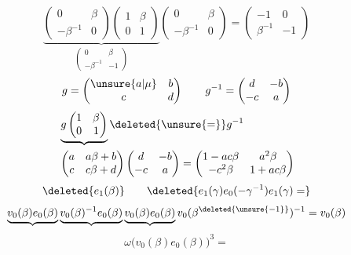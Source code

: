 \[\underbrace{\begin{pmatrix}0&\beta\\-\beta^{-1}&0\end{pmatrix}\begin{pmatrix}1&\beta\\0&1\end{pmatrix}}_{\begin{pmatrix}0&\beta\\-\beta^{-1}&-1\end{pmatrix}}\begin{pmatrix}0&\beta\\-\beta^{-1}&0\end{pmatrix}=\begin{pmatrix}-1&0\\\beta^{-1}&-1\end{pmatrix}\]
\[g=\begin{pmatrix}\unsure{a|\mu}&b\\c&d\end{pmatrix}\qquad g^{-1}=\begin{pmatrix}d&-b\\-c&a\end{pmatrix}\]
\[\begin{aligned}
&\underbrace{g\begin{pmatrix}1&\beta\\0&1\end{pmatrix}}\deleted{\unsure{=}}g^{-1}\\
&\begin{pmatrix}a&a\beta+b\\c&c\beta+d\end{pmatrix}\begin{pmatrix}d&-b\\-c&a\end{pmatrix}=\begin{pmatrix}1-ac\beta&a^2\beta\\-c^2\beta&1+ac\beta\end{pmatrix}
\end{aligned}\]
\[\deleted{e_1(\beta)}\qquad \deleted{e_1(\gamma)e_0(-\gamma^{-1})e_1(\gamma)=}\]
\[\underbrace{v_0(\beta)e_0(\beta)}\underbrace{v_0(\beta)^{-1}e_0(\beta)}\underbrace{v_0(\beta)e_0(\beta)}v_0(\beta^{\deleted{\unsure{-1}}})^{-1}=v_0(\beta)\]
\[\omega\big(v_0(\beta)e_0(\beta)\big)^3=\]
